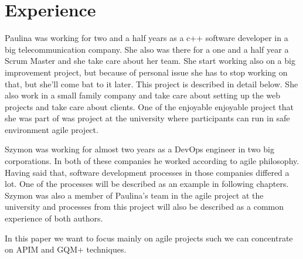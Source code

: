 \section{Experience}

Paulina was working for two and a half years as a c++ software developer in a big telecommunication company. She also was there for a one and a half year a Scrum Master and she take care about her team. She start working also on a big improvement project, but because of personal issue she has to stop working on that, but she'll come bat to it later. This project is described in detail below. She also work in a small family company and take care about setting up the web projects and take care about clients. One of the enjoyable enjoyable project that she was part of was project at the university where participants can run in safe environment agile project. 

Szymon was working for almost two years as a DevOps engineer in two big corporations. In both of these companies he worked according to agile philosophy. Having said that, software development processes in those companies differed a lot. One of the processes will be described as an example in following chapters. Szymon was also a member of Paulina's team in the agile project at the university and processes from this project will also be described as a common experience of both authors.

In this paper we want to focus mainly on agile projects such we can concentrate on APIM and GQM+ techniques.

